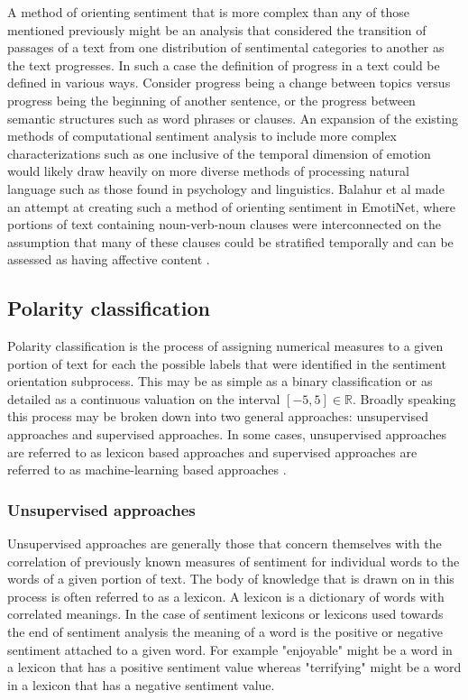 \documentclass[letterpaper, 10 pt, conference]{ieeeconf}
\begin{document}
A method of orienting sentiment that is more complex than any of those mentioned previously might be an analysis that considered the transition of passages of a text from one distribution of sentimental categories to another as the text progresses. In such a case the definition of progress in a text could be defined in various ways. Consider progress being a change between topics versus progress being the beginning of another sentence, or the progress between semantic structures such as word phrases or clauses. An expansion of the existing methods of computational sentiment analysis to include more complex characterizations such as one inclusive of the temporal dimension of emotion would likely draw heavily on more diverse methods of processing natural language such as those found in psychology and linguistics. Balahur et al made an attempt at creating such a method of orienting sentiment in EmotiNet, where portions of text containing noun-verb-noun clauses were interconnected on the assumption that many of these clauses could be stratified temporally and can be assessed as having affective content \textcolor{gray}{\cite{Balahur}}.

\subsection{Polarity classification} 
Polarity classification is the process of assigning numerical measures to a given portion of text for each the possible labels that were identified in the sentiment orientation subprocess. This may be as simple as a binary classification or as detailed as a continuous valuation on the interval $[-5,5] \in \mathbb{R}$. Broadly speaking this process may be broken down into two general approaches: unsupervised approaches and supervised approaches. In some cases, unsupervised approaches are referred to as lexicon based approaches and supervised approaches are referred to as machine-learning based approaches \textcolor{gray}{\cite{RaviRavi}}.

\subsubsection{Unsupervised approaches}
Unsupervised approaches are generally those that concern themselves with the correlation of previously known measures of sentiment for individual words to the words of a given portion of text. The body of knowledge that is drawn on in this process is often referred to as a lexicon. A lexicon is a dictionary of words with correlated meanings. In the case of sentiment lexicons or lexicons used towards the end of sentiment analysis the meaning of a word is the positive or negative sentiment attached to a given word. For example "enjoyable" might be a word in a lexicon that has a positive sentiment value whereas "terrifying" might be a word in a lexicon that has a negative sentiment value.
\end{document}
